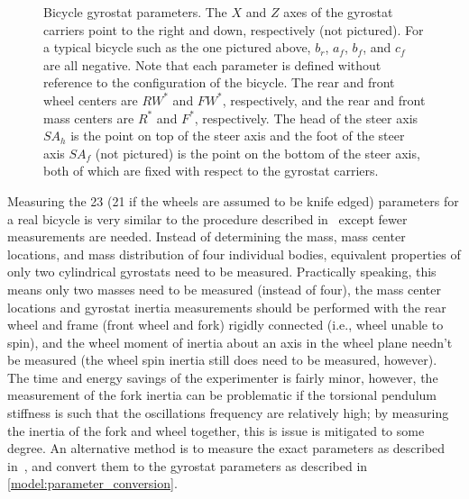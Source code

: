 \begin{figure}[htbp]
  \caption[Bicycle gyrostat parameters.]{Bicycle gyrostat parameters. The $X$
    and $Z$ axes of the gyrostat carriers point to the right and down,
    respectively (not pictured). For a typical bicycle such as the one pictured
    above, $b_r$, $a_f$, $b_f$, and $c_f$ are all negative. Note that each
    parameter is defined without reference to the configuration of the bicycle.
    The rear and front wheel centers are $RW^*$ and $FW^*$, respectively, and
    the rear and front mass centers are $R^*$ and $F^*$, respectively.  The
    head of the steer axis $SA_h$ is the point on top of the steer axis and the
    foot of the steer axis $SA_f$ (not pictured) is the point on the bottom of the
    steer axis, both of which are fixed with respect to the gyrostat carriers.}
\label{model:fig:bicycle}
\end{figure}

Measuring the 23 (21 if the wheels are assumed to be knife edged) parameters
for a real bicycle is very similar to the procedure described
in~\cite{Moore2010b} except fewer measurements are needed. Instead of
determining the mass, mass center locations, and mass distribution of four
individual bodies, equivalent properties of only two cylindrical gyrostats need
to be measured. Practically speaking, this means only two masses need to be
measured (instead of four), the mass center locations and gyrostat inertia
measurements should be performed with the rear wheel and frame (front wheel and
fork) rigidly connected (i.e., wheel unable to spin), and the wheel moment of
inertia about an axis in the wheel plane needn't be measured (the wheel spin
inertia still does need to be measured, however). The time and energy savings
of the experimenter is fairly minor, however, the measurement of the fork
inertia can be problematic if the torsional pendulum stiffness is such that the
oscillations frequency are relatively high; by measuring the inertia of the
fork and wheel together, this is issue is mitigated to some degree. An
alternative method is to measure the exact parameters as described
in~\cite{Moore2010b}, and convert them to the gyrostat parameters as described
in \autoref{model:parameter_conversion}.

